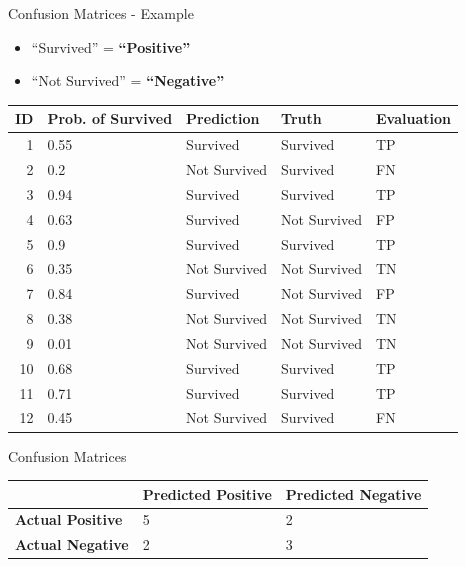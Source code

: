 \documentclass[
  ignorenonframetext,
]{beamer}
\providecommand{\tightlist}{%
  \setlength{\itemsep}{0pt}\setlength{\parskip}{0pt}}
\begin{document}
\begin{frame}{Confusion Matrices - Example}
\protect\hypertarget{confusion-matrices---example}{}
\begin{itemize}
\tightlist
\item
  ``Survived'' = \textbf{``Positive''}
\item
  ``Not Survived'' = \textbf{``Negative''}
\end{itemize}

\begin{longtable}[]{@{}rllll@{}}
\toprule
ID & Prob. of Survived & Prediction & Truth & Evaluation \\
\midrule
\endhead
1 & 0.55 & Survived & Survived & TP \\
2 & 0.2 & Not Survived & Survived & FN \\
3 & 0.94 & Survived & Survived & TP \\
4 & 0.63 & Survived & Not Survived & FP \\
5 & 0.9 & Survived & Survived & TP \\
6 & 0.35 & Not Survived & Not Survived & TN \\
7 & 0.84 & Survived & Not Survived & FP \\
8 & 0.38 & Not Survived & Not Survived & TN \\
9 & 0.01 & Not Survived & Not Survived & TN \\
10 & 0.68 & Survived & Survived & TP \\
11 & 0.71 & Survived & Survived & TP \\
12 & 0.45 & Not Survived & Survived & FN \\
\bottomrule
\end{longtable}
\end{frame}

\begin{frame}{Confusion Matrices}
\protect\hypertarget{confusion-matrices-2}{}
\begin{longtable}[]{@{}lll@{}}
\toprule
& Predicted Positive & Predicted Negative \\
\midrule
\endhead
\textbf{Actual Positive} & 5 & 2 \\
\textbf{Actual Negative} & 2 & 3 \\
\bottomrule
\end{longtable}
\end{frame}
\end{document}
